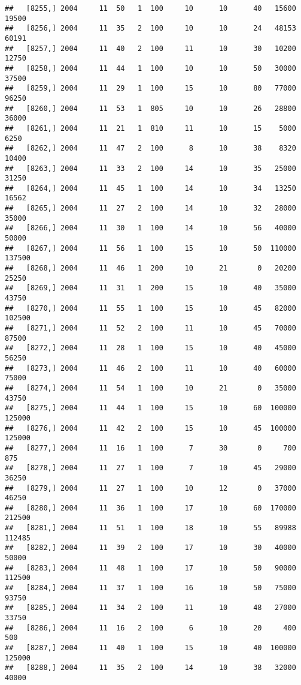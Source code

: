 \documentclass{article}\usepackage[]{graphicx}\usepackage[]{color}
\makeatletter
\newenvironment{kframe}{%
 \def\at@end@of@kframe{}%
 \ifinner\ifhmode%
  \def\at@end@of@kframe{\end{minipage}}%
  \begin{minipage}{\columnwidth}%
 \fi\fi%
 \def\FrameCommand##1{\hskip\@totalleftmargin \hskip-\fboxsep
 \colorbox{shadecolor}{##1}\hskip-\fboxsep
     \hskip-\linewidth \hskip-\@totalleftmargin \hskip\columnwidth}%
 \MakeFramed {\advance\hsize-\width
   \@totalleftmargin\z@ \linewidth\hsize
   \@setminipage}}%
 {\par\unskip\endMakeFramed%
 \at@end@of@kframe}
\newenvironment{knitrout}{}{} %
\makeatother
\begin{document}
\begin{knitrout}
\begin{kframe}
\begin{verbatim}
##   [8255,] 2004     11  50   1  100     10      10      40   15600   19500
##   [8256,] 2004     11  35   2  100     10      10      24   48153   60191
##   [8257,] 2004     11  40   2  100     11      10      30   10200   12750
##   [8258,] 2004     11  44   1  100     10      10      50   30000   37500
##   [8259,] 2004     11  29   1  100     15      10      80   77000   96250
##   [8260,] 2004     11  53   1  805     10      10      26   28800   36000
##   [8261,] 2004     11  21   1  810     11      10      15    5000    6250
##   [8262,] 2004     11  47   2  100      8      10      38    8320   10400
##   [8263,] 2004     11  33   2  100     14      10      35   25000   31250
##   [8264,] 2004     11  45   1  100     14      10      34   13250   16562
##   [8265,] 2004     11  27   2  100     14      10      32   28000   35000
##   [8266,] 2004     11  30   1  100     14      10      56   40000   50000
##   [8267,] 2004     11  56   1  100     15      10      50  110000  137500
##   [8268,] 2004     11  46   1  200     10      21       0   20200   25250
##   [8269,] 2004     11  31   1  200     15      10      40   35000   43750
##   [8270,] 2004     11  55   1  100     15      10      45   82000  102500
##   [8271,] 2004     11  52   2  100     11      10      45   70000   87500
##   [8272,] 2004     11  28   1  100     15      10      40   45000   56250
##   [8273,] 2004     11  46   2  100     11      10      40   60000   75000
##   [8274,] 2004     11  54   1  100     10      21       0   35000   43750
##   [8275,] 2004     11  44   1  100     15      10      60  100000  125000
##   [8276,] 2004     11  42   2  100     15      10      45  100000  125000
##   [8277,] 2004     11  16   1  100      7      30       0     700     875
##   [8278,] 2004     11  27   1  100      7      10      45   29000   36250
##   [8279,] 2004     11  27   1  100     10      12       0   37000   46250
##   [8280,] 2004     11  36   1  100     17      10      60  170000  212500
##   [8281,] 2004     11  51   1  100     18      10      55   89988  112485
##   [8282,] 2004     11  39   2  100     17      10      30   40000   50000
##   [8283,] 2004     11  48   1  100     17      10      50   90000  112500
##   [8284,] 2004     11  37   1  100     16      10      50   75000   93750
##   [8285,] 2004     11  34   2  100     11      10      48   27000   33750
##   [8286,] 2004     11  16   2  100      6      10      20     400     500
##   [8287,] 2004     11  40   1  100     15      10      40  100000  125000
##   [8288,] 2004     11  35   2  100     14      10      38   32000   40000

\end{verbatim}
\end{kframe}
\end{knitrout}
\end{document}
